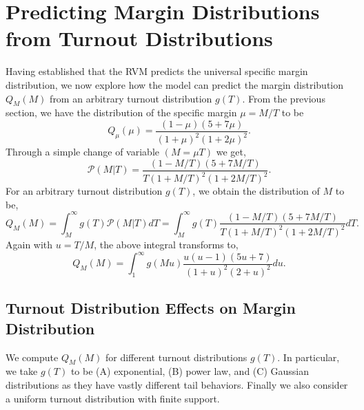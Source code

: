 \section{Predicting Margin Distributions from Turnout Distributions}
Having established that the RVM predicts the universal specific margin distribution, we now explore how the model can predict the margin distribution $Q_M(M)$ from an arbitrary turnout distribution $g(T)$. From the previous section, we have the distribution of the specific margin $\mu = M / T$ to be
\begin{equation}
    Q_{\mu}\left(\mu\right) = \frac{(1 - \mu)(5 + 7\mu)}{(1 + \mu)^2(1 + 2\mu)^2}.
\end{equation}
Through a simple change of variable $(M = \mu T)$ we get,
\begin{equation}
    \mathcal{P}(M|T) = \frac{(1 - M / T)(5 + 7M /T)}{T(1 + M / T)^2(1 + 2M / T)^2}.
\end{equation}
For an arbitrary turnout distribution $g(T)$, we obtain the distribution of $M$ to be,
\begin{equation}
    Q_M(M) = \int_{M}^{\infty}g(T)\mathcal{P}(M |T) dT = \int_{M}^{\infty}g(T)\frac{(1 - M / T)(5 + 7M /T)}{T(1 + M / T)^2(1 + 2M / T)^2} dT.
\end{equation}
Again with $u = T / M$, the above integral transforms to,
\begin{equation}
    Q_M(M) = \int_{1}^{\infty}g(Mu)\frac{u(u - 1)(5u + 7)}{(1 + u)^2 (2 + u)^2}du.
    \label{eq:pm}
\end{equation}
\subsection{Turnout Distribution Effects on Margin Distribution}
We compute $Q_M(M)$ for different turnout distributions $g(T)$. In particular, we take $g(T)$ to be (A) exponential, (B) power law, and (C) Gaussian distributions as they have vastly different tail behaviors. Finally we also consider a uniform turnout distribution with finite support.
